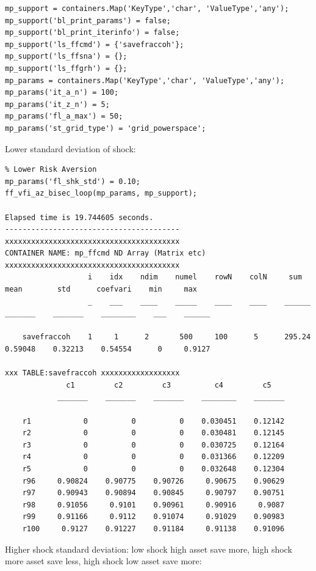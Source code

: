 \documentclass[
]{book}
\begin{document}
\begin{verbatim}
mp_support = containers.Map('KeyType','char', 'ValueType','any');
mp_support('bl_print_params') = false;
mp_support('bl_print_iterinfo') = false;
mp_support('ls_ffcmd') = {'savefraccoh'};
mp_support('ls_ffsna') = {};
mp_support('ls_ffgrh') = {};
mp_params = containers.Map('KeyType','char', 'ValueType','any');
mp_params('it_a_n') = 100;
mp_params('it_z_n') = 5;
mp_params('fl_a_max') = 50;
mp_params('st_grid_type') = 'grid_powerspace';
\end{verbatim}

Lower standard deviation of shock:

\begin{verbatim}
% Lower Risk Aversion
mp_params('fl_shk_std') = 0.10;
ff_vfi_az_bisec_loop(mp_params, mp_support);

Elapsed time is 19.744605 seconds.
----------------------------------------
xxxxxxxxxxxxxxxxxxxxxxxxxxxxxxxxxxxxxxxx
CONTAINER NAME: mp_ffcmd ND Array (Matrix etc)
xxxxxxxxxxxxxxxxxxxxxxxxxxxxxxxxxxxxxxxx
                   i    idx    ndim    numel    rowN    colN     sum       mean        std      coefvari    min     max  
                   _    ___    ____    _____    ____    ____    ______    _______    _______    ________    ___    ______

    savefraccoh    1     1      2       500     100      5      295.24    0.59048    0.32213    0.54554      0     0.9127

xxx TABLE:savefraccoh xxxxxxxxxxxxxxxxxx
              c1         c2         c3          c4         c5   
            _______    _______    _______    ________    _______

    r1            0          0          0    0.030451    0.12142
    r2            0          0          0    0.030481    0.12145
    r3            0          0          0    0.030725    0.12164
    r4            0          0          0    0.031366    0.12209
    r5            0          0          0    0.032648    0.12304
    r96     0.90824    0.90775    0.90726     0.90675    0.90629
    r97     0.90943    0.90894    0.90845     0.90797    0.90751
    r98     0.91056     0.9101    0.90961     0.90916     0.9087
    r99     0.91166     0.9112    0.91074     0.91029    0.90983
    r100     0.9127    0.91227    0.91184     0.91138    0.91096
\end{verbatim}

Higher shock standard deviation: low shock high asset save more, high
shock more asset save less, high shock low asset save more:
\end{document}
